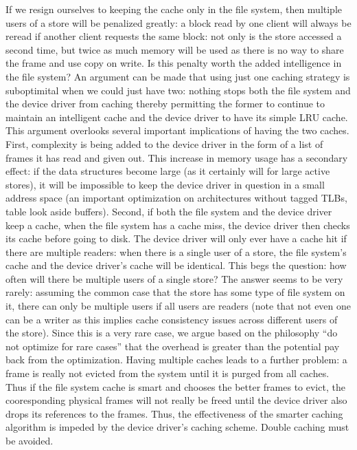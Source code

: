 If we resign ourselves to keeping the cache only in the file system,
then multiple users of a store will be penalized greatly: a block read
by one client will always be reread if another client requests the
same block: not only is the store accessed a second time, but twice as
much memory will be used as there is no way to share the frame and use
copy on write.  Is this penalty worth the added intelligence in the
file system?  An argument can be made that using just one caching
strategy is suboptimital when we could just have two: nothing stops
both the file system and the device driver from caching thereby
permitting the former to continue to maintain an intelligent cache and
the device driver to have its simple LRU cache.  This argument
overlooks several important implications of having the two caches.
First, complexity is being added to the device driver in the form of a
list of frames it has read and given out.  This increase in memory
usage has a secondary effect: if the data structures become large (as
it certainly will for large active stores), it will be impossible to
keep the device driver in question in a small address space (an
important optimization on architectures without tagged TLBs, table
look aside buffers).  Second, if both the file system and the device
driver keep a cache, when the file system has a cache miss, the device
driver then checks its cache before going to disk.  The device driver
will only ever have a cache hit if there are multiple readers: when
there is a single user of a store, the file system's cache and the
device driver's cache will be identical.  This begs the question: how
often will there be multiple users of a single store?  The answer
seems to be very rarely: assuming the common case that the store has
some type of file system on it, there can only be multiple users if
all users are readers (note that not even one can be a writer as this
implies cache consistency issues across different users of the store).
Since this is a very rare case, we argue based on the philosophy ``do
not optimize for rare cases'' that the overhead is greater than the
potential pay back from the optimization.  Having multiple caches
leads to a further problem: a frame is really not evicted from the
system until it is purged from all caches.  Thus if the file system
cache is smart and chooses the better frames to evict, the
cooresponding physical frames will not really be freed until the
device driver also drops its references to the frames.  Thus, the
effectiveness of the smarter caching algorithm is impeded by the
device driver's caching scheme.  Double caching must be avoided.


